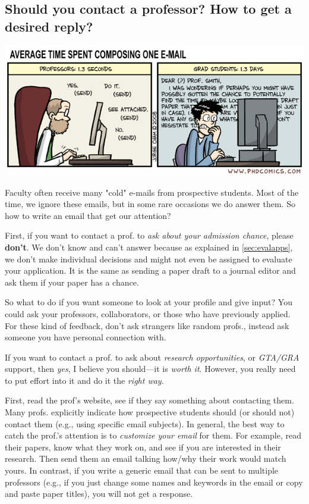 \documentclass[oneside,11pt]{memoir}
\begin{document}
\subsection{Should you contact a professor? How to get a desired reply?}\label{sec:contact}


\begin{center}
  \includegraphics[scale=0.6]{files/emails.png}
\end{center}


Faculty often receive many "cold" e-mails from prospective students. Most of the time, we ignore these emails, but in some rare occasions we do answer them. So how to write an email that get our attention?



First, if you want to contact a prof. to \emph{ask about your admission chance}, please \textbf{don't}. We don't know and can't answer because as explained in \autoref{sec:evalapps}, we don't make individual decisions and might not even be assigned to evaluate your application.  It is the same as sending a paper draft to a journal editor and ask them if your paper has a chance.

So what to do if you want someone to look at your profile and give input? You could ask your professors, collaborators, or those who have previously applied. For these kind of feedback,  don't ask strangers like random profs., instead ask someone you have personal connection with.  

If you want to contact a prof. to ask about \emph{research opportunities}, or \emph{GTA/GRA} support, then \emph{yes}, I believe you should---it is \emph{worth it}. However, you really need to put effort into it and do it the \emph{right way}.

First, read the prof's website, see if they say something about contacting them. Many profs. explicitly indicate how prospective students should (or should not) contact them (e.g., using specific email subjects).
In general, the best way to catch the prof.'s attention is to \emph{customize your email} for them.  For example, read their papers, know what they work on, and see if you are interested in their research. Then send them an email talking how/why their work would match yours.
In contrast, if you write a generic email that can be sent to multiple professors (e.g., if you just change some names and keywords in the email or copy and paste paper titles), you will not get a response.
\end{document}
